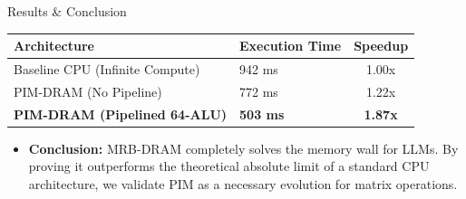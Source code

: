 \documentclass[aspectratio=169]{beamer}
\begin{document}
\begin{frame}{Results \& Conclusion}
    \begin{table}[]
        \centering
        \begin{tabular}{@{}llc@{}}
        \toprule
        \textbf{Architecture} & \textbf{Execution Time} & \textbf{Speedup} \\ \midrule
        Baseline CPU (Infinite Compute) & 942 ms & 1.00x \\
        PIM-DRAM (No Pipeline) & 772 ms & 1.22x \\
        \textbf{PIM-DRAM (Pipelined 64-ALU)} & \textbf{503 ms} & \textbf{1.87x} \\ \bottomrule
        \end{tabular}
    \end{table}
    \vspace{0.5cm}
    \begin{itemize}
        \item \textbf{Conclusion:} MRB-DRAM completely solves the memory wall for LLMs. By proving it outperforms the theoretical absolute limit of a standard CPU architecture, we validate PIM as a necessary evolution for matrix operations.
    \end{itemize}
\end{frame}
\end{document}
